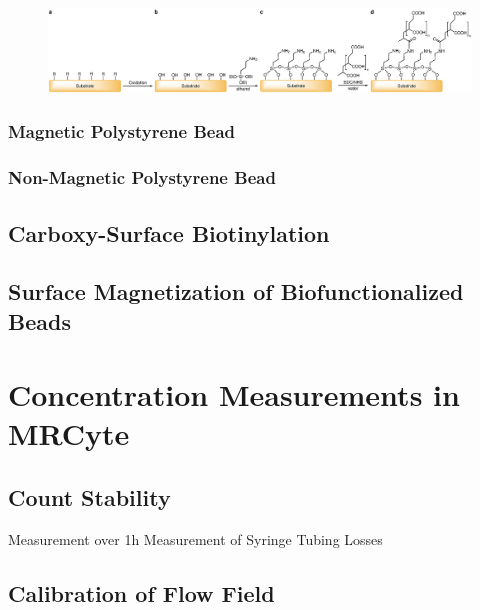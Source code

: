 \begin{figure}[htb!]
	\centering
	\includegraphics[width=1\linewidth]{Ressources/Chemistry/Substrate}
	\label{fig:chem:func:withPAA}
\end{figure}



\subsubsection{Magnetic Polystyrene Bead}
\cleardoubleemptypage
\subsubsection{Non-Magnetic Polystyrene Bead}
\cleardoubleemptypage
\subsection{Carboxy-Surface Biotinylation}

\subsection{Surface Magnetization of Biofunctionalized Beads}


\section{Concentration Measurements in MRCyte}

\subsection{Count Stability}
Measurement over 1h
Measurement of Syringe Tubing Losses

\subsection{Calibration of Flow Field}

